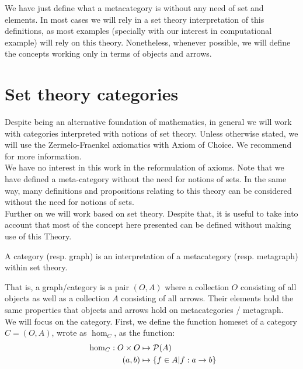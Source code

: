 We have just define what a  metacategory is without any need of set and elements. In most cases we will rely in a set theory interpretation of this definitions, as most examples (specially with our interest in computational example) will rely on this theory. Nonetheless, whenever possible, we will define the concepts working only in terms of objects and arrows.\\






\section{Set theory categories}
Despite being an alternative foundation of mathematics, in general we will work with categories interpreted with notions of set theory. Unless otherwise stated, we will use the Zermelo-Fraenkel axiomatics with Axiom of Choice. We recommend \cite{kunen2014set} for more information.\\

We have no interest in this work in the reformulation of axioms. Note that  we have defined a meta-category without the need for notions of sets. In the same way,  many definitions and propositions relating to this theory can be considered without the need for notions of sets.\\


Further on we will work based on set theory. Despite that, it is useful to take into account that most of the concept here presented can be defined without making use of this Theory. 

\begin{definition}
  A category (resp. graph) is an interpretation of a metacategory (resp. metagraph) within set theory.
\end{definition}


That is, a graph/category is a pair $(O,A)$ where a collection $O$ consisting of all objects as well as a collection $A$ consisting of all arrows. Their elements hold the same properties that objects and arrows hold on metacategories / metagraph.\\


We will focus on the category. First, we define the function homeset of a category $C=(O,A)$, wrote as $\hom_{C}$, as the function:
\begin{align*}
  && \hom_{C}: O \times O &\mapsto \mathcal{P}(A)&\\
  \displaystyle &\ &(a,b)&\mapsto \{f\in A | f:a\to b\}&
\end{align*}

